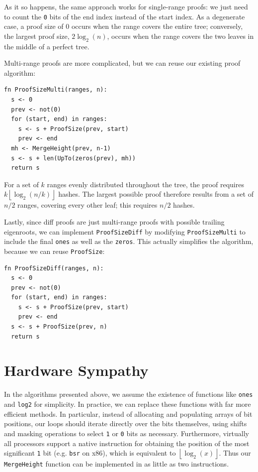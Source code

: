 \documentclass[twocolumn]{article}
\begin{document}
As it so happens, the same approach works for single-range proofs: we just need to count the \verb`0` bits of the end index instead of the start index. As a degenerate case, a proof size of 0 occurs when the range covers the entire tree; conversely, the largest proof size, $2\log_2(n)$, occurs when the range covers the two leaves in the middle of a perfect tree.

Multi-range proofs are more complicated, but we can reuse our existing proof algorithm:

\begin{minipage}[c]{0.95\textwidth}
\begin{lstlisting}
fn ProofSizeMulti(ranges, n):
  s <- 0
  prev <- not(0)
  for (start, end) in ranges:
    s <- s + ProofSize(prev, start)
    prev <- end
  mh <- MergeHeight(prev, n-1)
  s <- s + len(UpTo(zeros(prev), mh))
  return s
\end{lstlisting}
\end{minipage}

For a set of $k$ ranges evenly distributed throughout the tree, the proof requires $k\left \lfloor{\log_2(n/k)}\right \rfloor$ hashes. The largest possible proof therefore results from a set of $n/2$ ranges, covering every other leaf; this requires $n/2$ hashes.

Lastly, since diff proofs are just multi-range proofs with possible trailing eigenroots, we can implement \verb`ProofSizeDiff` by modifying \verb`ProofSizeMulti` to include the final \verb`ones` as well as the \verb`zeros`. This actually simplifies the algorithm, because we can reuse \verb`ProofSize`:

\begin{minipage}[c]{0.1\textwidth}
\begin{lstlisting}
fn ProofSizeDiff(ranges, n):
  s <- 0
  prev <- not(0)
  for (start, end) in ranges:
    s <- s + ProofSize(prev, start)
    prev <- end
  s <- s + ProofSize(prev, n)
  return s
\end{lstlisting}
\end{minipage}


\section{Hardware Sympathy}


In the algorithms presented above, we assume the existence of functions like \verb`ones` and \verb`log2` for simplicity. In practice, we can replace these functions with far more efficient methods. In particular, instead of allocating and populating arrays of bit positions, our loops should iterate directly over the bits themselves, using shifts and masking operations to select \verb`1` or \verb`0` bits as necessary. Furthermore, virtually all processors support a native instruction for obtaining the position of the most significant \verb`1` bit (e.g. \verb`bsr` on x86), which is equivalent to $\left \lfloor{\log_2(x)}\right \rfloor$. Thus our \verb`MergeHeight` function can be implemented in as little as two instructions.
\end{document}
